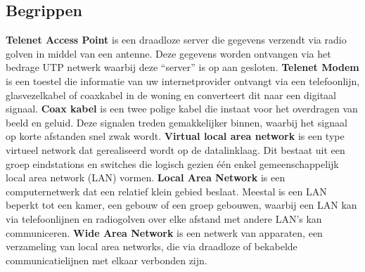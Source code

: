 \subsection{Begrippen}
\textbf{Telenet Access Point} is een draadloze server die gegevens verzendt via radio golven in middel van een antenne. Deze gegevens worden ontvangen via het bedrage UTP netwerk waarbij deze “server” is op aan gesloten.
\newline
\newline
\textbf{Telenet Modem} is een toestel die informatie van uw internetprovider ontvangt via een telefoonlijn, glasvezelkabel of coaxkabel in de woning en converteert dit naar een digitaal signaal.
\newline
\newline
\textbf{Coax kabel} is een twee polige kabel die instaat voor het overdragen van beeld en geluid. Deze signalen treden gemakkelijker binnen, waarbij het signaal op korte afstanden snel zwak wordt. 
\newline
\newline
\textbf{Virtual local area network} is een type virtueel network dat gerealiseerd wordt op de datalinklaag. Dit bestaat uit een groep eindstations en switches die logisch gezien één enkel gemeenschappelijk local area network (LAN) vormen.
\newline
\newline
\textbf{Local Area Network} is een computernetwerk dat een relatief klein gebied beslaat. Meestal is een LAN beperkt tot een kamer, een gebouw of een groep gebouwen, waarbij een LAN kan via telefoonlijnen en radiogolven over elke afstand met andere LAN's kan communiceren.
\newline
\newline
\textbf{Wide Area Network} is een netwerk van apparaten, een verzameling van local area networks, die via draadloze of bekabelde communicatielijnen met elkaar verbonden zijn.

